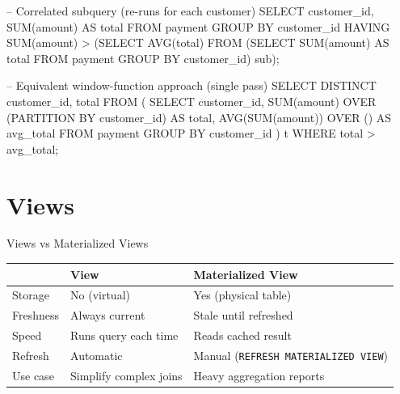 \documentclass[11pt,a4paper]{article}
\begin{document}
\begin{sqlcode}[title={\texttt{</>}\quad Example --- Correlated vs JOIN rewrite}]
-- Correlated subquery (re-runs for each customer)
SELECT customer_id, SUM(amount) AS total
FROM   payment
GROUP  BY customer_id
HAVING SUM(amount) > (SELECT AVG(total) FROM
                      (SELECT SUM(amount) AS total FROM payment
                       GROUP BY customer_id) sub);

-- Equivalent window-function approach (single pass)
SELECT DISTINCT customer_id, total
FROM (
    SELECT customer_id,
           SUM(amount) OVER (PARTITION BY customer_id) AS total,
           AVG(SUM(amount)) OVER ()                    AS avg_total
    FROM   payment
    GROUP  BY customer_id
) t
WHERE total > avg_total;
\end{sqlcode}

\section{Views}

\begin{conceptbox}{Views vs Materialized Views}
\begin{center}
\begin{tabular}{@{}p{4cm} p{4.5cm} p{4.5cm}@{}}
\toprule
& \textbf{View} & \textbf{Materialized View} \\
\midrule
Storage    & No (virtual)       & Yes (physical table) \\
Freshness  & Always current     & Stale until refreshed \\
Speed      & Runs query each time & Reads cached result \\
Refresh    & Automatic          & Manual (\texttt{REFRESH MATERIALIZED VIEW}) \\
Use case   & Simplify complex joins & Heavy aggregation reports \\
\bottomrule
\end{tabular}
\end{center}
\end{conceptbox}
\end{document}
